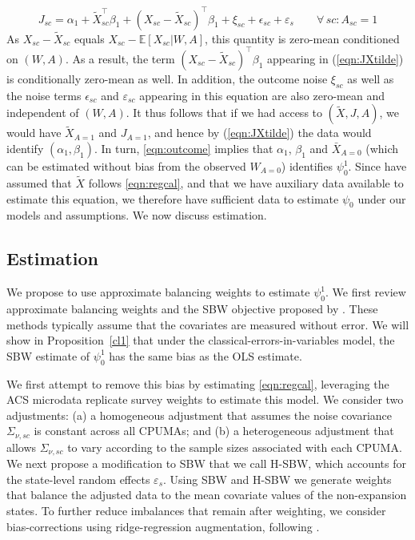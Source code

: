 \documentclass[aoas]{imsart}
\theoremstyle{plain}
\theoremstyle{remark}
\begin{document}
\begin{equation} \label{eqn:JXtilde}
    J_{sc} = \alpha_1 + \tilde{X}_{sc}^\top\beta_1 + (X_{sc} - \tilde{X}_{sc})^\top\beta_1 + \xi_{sc} + \epsilon_{sc} + \varepsilon_s \qquad\forall\, sc: A_{sc} = 1
\end{equation}
As $X_{sc} - \tilde{X}_{sc}$ equals $X_{sc} - \mathbb{E}[X_{sc}|W,A]$, this quantity is zero-mean conditioned on $(W,A)$. As a result, the term $(X_{sc} - \tilde{X}_{sc})^\top\beta_1$ appearing in (\ref{eqn:JXtilde}) is conditionally zero-mean as well. In addition, the outcome noise $\xi_{sc}$ as well as the noise terms $\epsilon_{sc}$ and $\varepsilon_{sc}$ appearing in this equation are also zero-mean and independent of $(W,A)$. It thus follows that if we had access to $(\tilde{X}, J, A)$, we would have $\tilde{X}_{A=1}$ and $J_{A=1}$, and hence by (\ref{eqn:JXtilde}) the data would identify $(\alpha_1, \beta_1)$. In turn, \eqref{eqn:outcome} implies that $\alpha_1$, $\beta_1$ and $\bar{X}_{A=0}$ (which can be estimated without bias from the observed $W_{A=0}$) identifies $\psi_0^1$. Since have assumed that $\tilde{X}$ follows \eqref{eqn:regcal}, and that we have auxiliary data available to estimate this equation, we therefore have sufficient data to estimate $\psi_0$ under our models and assumptions. We now discuss estimation.

\subsection{Estimation}\label{ssec:estimation}

We propose to use approximate balancing weights to estimate $\psi_0^1$. We first review approximate balancing weights and the SBW objective proposed by \cite{zubizarreta2015stable}. These methods typically assume that the covariates are measured without error. We will show in Proposition~\ref{cl1} that under the classical-errors-in-variables model, the SBW estimate of $\psi_0^1$ has the same bias as the OLS estimate.

We first attempt to remove this bias by estimating \eqref{eqn:regcal}, leveraging the ACS microdata replicate survey weights to estimate this model. We consider two adjustments: (a) a homogeneous adjustment that assumes the noise covariance $\Sigma_{\nu, sc}$ is constant across all CPUMAs; and (b) a heterogeneous adjustment that allows $\Sigma_{\nu,sc}$ to vary according to the sample sizes associated with each CPUMA. We next propose a modification to SBW that we call H-SBW, which accounts for the state-level random effects $\varepsilon_s$. Using SBW and H-SBW we generate weights that balance the adjusted data to the mean covariate values of the non-expansion states. To further reduce imbalances that remain after weighting, we consider bias-corrections using ridge-regression augmentation, following \cite{ben2021augmented}. 
\end{document}
